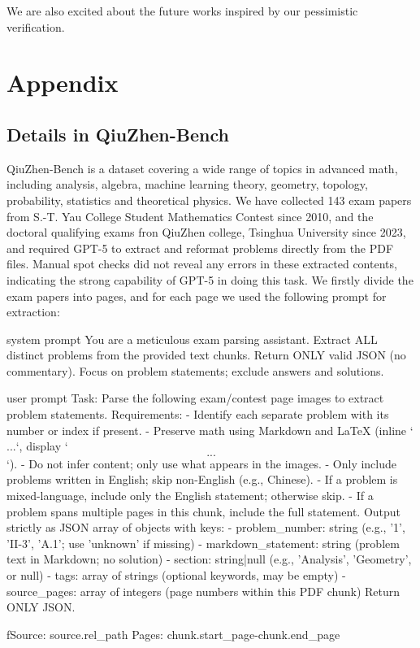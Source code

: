 \documentclass{article} %
\begin{document}
We are also excited about the future works inspired by our pessimistic verification.




\appendix
\section{Appendix}

\subsection{Details in QiuZhen-Bench}\label{sec:qiuzhen-bench}

QiuZhen-Bench is a dataset covering a wide range of topics in advanced math, including analysis, algebra, machine learning theory, geometry, topology, probability, statistics and theoretical physics. We have collected 143 exam papers from S.-T. Yau College Student Mathematics Contest since 2010, and the doctoral qualifying exams fron QiuZhen college, Tsinghua University since 2023, and required GPT-5 to extract and reformat problems directly from the PDF files. Manual spot checks did not reveal any errors in these extracted contents, indicating the strong capability of GPT-5 in doing this task. We firstly divide the exam papers into pages, and for each page we used the following prompt for extraction:

\begin{promptlisting}{system prompt}
You are a meticulous exam parsing assistant.
Extract ALL distinct problems from the provided text chunks.
Return ONLY valid JSON (no commentary). Focus on problem statements; exclude answers and solutions.
\end{promptlisting}

\begin{promptlisting}{user prompt}
Task: Parse the following exam/contest page images to extract problem statements.
Requirements:
- Identify each separate problem with its number or index if present.
- Preserve math using Markdown and LaTeX (inline `$...$`, display `$$...$$`).
- Do not infer content; only use what appears in the images.
- Only include problems written in English; skip non-English (e.g., Chinese).
- If a problem is mixed-language, include only the English statement; otherwise skip.
- If a problem spans multiple pages in this chunk, include the full statement.
Output strictly as JSON array of objects with keys:
  - problem_number: string (e.g., '1', 'II-3', 'A.1'; use 'unknown' if missing)
  - markdown_statement: string (problem text in Markdown; no solution)
  - section: string|null (e.g., 'Analysis', 'Geometry', or null)
  - tags: array of strings (optional keywords, may be empty)
  - source_pages: array of integers (page numbers within this PDF chunk)
Return ONLY JSON.

fSource: {source.rel_path}
Pages: {chunk.start_page}-{chunk.end_page}
\end{promptlisting}
\end{document}
